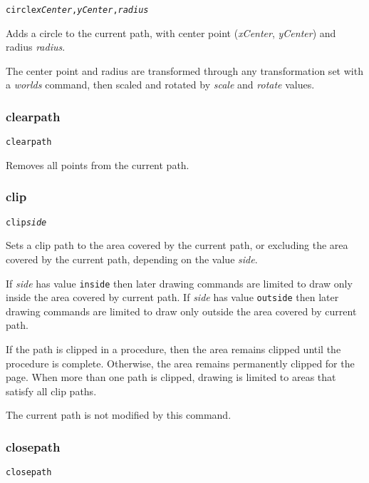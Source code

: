 \begin{alltt}
circle \textit{xCenter}, \textit{yCenter}, \textit{radius}
\end{alltt}

Adds a circle to the current path, with center
point (\textit{xCenter}, \textit{yCenter}) and radius
\textit{radius}.

The center point and radius are transformed through any
transformation set with a \textit{worlds} command,
then scaled and rotated by \textit{scale}
and \textit{rotate} values.

\subsubsection{clearpath}

\begin{alltt}
clearpath
\end{alltt}

Removes all points from the current path.

\subsubsection{clip}

\begin{alltt}
clip \textit{side}
\end{alltt}

Sets a clip path to the area covered by the current path,
or excluding the area covered by the current path, depending
on the value \textit{side}.

If \textit{side} has value \texttt{inside} then
later drawing commands are limited to draw only inside the area
covered by current path.
If \textit{side} has value \texttt{outside} then
later drawing commands are limited to draw only outside the area
covered by current path.

If the path is clipped in a procedure, then the area remains
clipped until the procedure is complete.  Otherwise, the area
remains permanently clipped for the page.
When more than one path is clipped, drawing is limited to
areas that satisfy all clip paths.

The current path is not modified by this command.

\subsubsection{closepath}

\begin{alltt}
closepath
\end{alltt}

